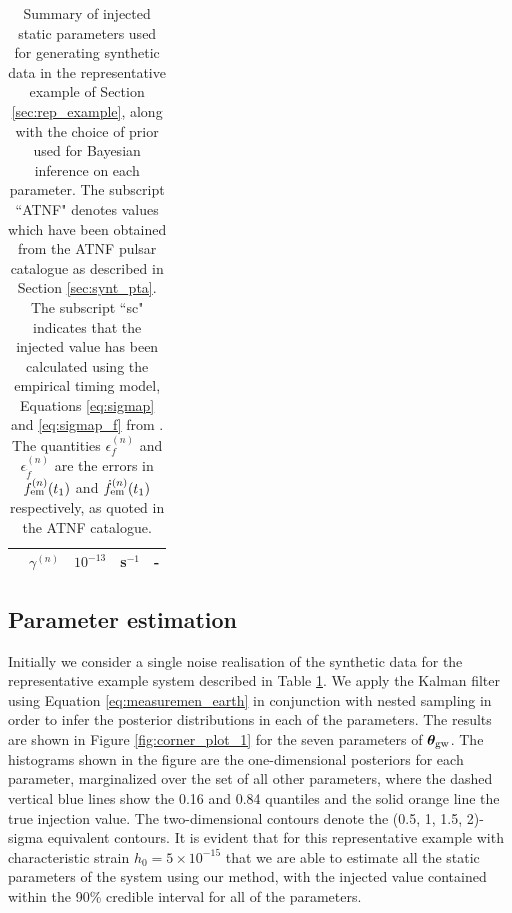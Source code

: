 \documentclass[fleqn,usenatbib,useAMS]{mnras}
\begin{document}
\begin{table}
\begin{tabular}{lccll}
		& $\gamma^{(n)}$              & $10^{-13}$ & s$^{-1}$ & - \\
		\bottomrule
	\end{tabular}
	\caption{Summary of injected static parameters used for generating synthetic data in the representative example of Section \ref{sec:rep_example}, along with the choice of prior used for Bayesian inference on each parameter. The subscript ``ATNF" denotes values which have been obtained from the ATNF pulsar catalogue as described in Section \ref{sec:synt_pta}. The subscript ``sc" indicates that the injected value has been calculated using the empirical timing model, Equations \eqref{eq:sigmap} and \eqref{eq:sigmap_f} from \protect \cite{Shannon2010}. The quantities $\epsilon^{(n)}_{f}$ and $\epsilon^{(n)}_{\dot{f}}$ are the errors in $f^{(n)}_{\rm em} (t_1)$ and $\dot{f}^{(n)}_{\rm em} (t_1)$ respectively, as quoted in the ATNF catalogue.}
	\label{tab:parameters_and_priors}
\end{table}




\subsection{Parameter estimation}\label{sec:parameter_estim}

	

	Initially we consider a single noise realisation of the synthetic data for the representative example system described in Table \ref{tab:parameters_and_priors}. We apply the Kalman filter using Equation \eqref{eq:measuremen_earth} in conjunction with nested sampling in order to infer the posterior distributions in each of the parameters. The results are shown in Figure \ref{fig:corner_plot_1} for the seven parameters of  $\boldsymbol{\theta}_{\rm gw}$. The histograms shown in the figure are the one-dimensional posteriors for each parameter, marginalized over the set of all other parameters, where the dashed vertical blue lines show the 0.16 and 0.84 quantiles and the solid orange line the true injection value. The two-dimensional contours denote the (0.5, 1, 1.5, 2)-sigma equivalent contours. It is evident that for this representative example with characteristic strain $h_0 = 5 \times 10^{-15}$ that we are able to estimate all the static parameters of the system using our method, with the injected value contained within the 90\% credible interval for all of the parameters. \newline 
 
\end{document}
